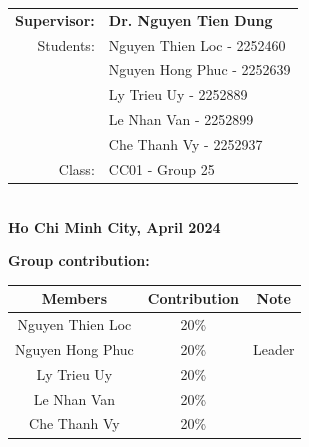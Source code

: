\documentclass[a4paper,12pt]{article}
\begin{document}
\begin{titlepage}
\begin{center}
    \begin{tabular}{r l}
        \textbf{Supervisor:}& \textbf{Dr. Nguyen Tien Dung} \\
        Students:&Nguyen Thien Loc - 2252460 \\ 
        &Nguyen Hong Phuc - 2252639 \\ 
        &Ly Trieu Uy  - 2252889 \\ 
        &Le Nhan Van - 2252899 \\ 
        &Che Thanh Vy - 2252937 \\
        Class:&CC01 - Group 25\\
    \end{tabular}
    \\
    \vspace{1 cm}
    \centering\textbf{Ho Chi Minh City, April 2024}
\end{center}
\end{titlepage}



\newpage
\vspace*{0.25 cm}
\textbf{Group contribution:}\\

\begin{longtable}{|c|c|c|}
    \hline
    Members & Contribution & Note\\
    \hline
    Nguyen Thien Loc     & 20\% &\\
    \hline
    Nguyen Hong Phuc     &  20\% & Leader\\
    \hline
    Ly Trieu Uy  &20\% &\\
    \hline
    Le Nhan Van & 20\% &\\ 
    \hline
    Che Thanh Vy & 20\% &\\
    \hline
\end{longtable}
\end{document}
